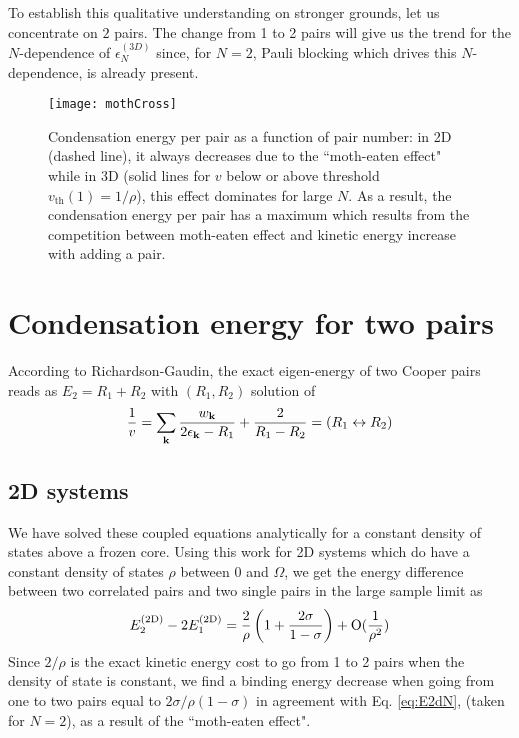 \documentclass[5p,twocolumn]{elsarticle}
\begin{document}
To establish this qualitative understanding on stronger  grounds, let us concentrate on  $2$ pairs. The change from 1 to 2 pairs will give us the trend for the $N$-dependence of $\epsilon^{(3D)}_N$ since, for $N=2$, Pauli blocking which drives this $N$-dependence, is already present.  

\begin{figure}[htb]
	\centering
		\texttt{[image: mothCross]}
	\caption{Condensation energy per pair as a function of pair number: in 2D (dashed line), it always decreases due to the ``moth-eaten effect" while in 3D (solid lines for  $v$ below or above threshold $v_{\text{th}}(1)=1/\rho$), this effect dominates for large $N$. As a result, the condensation energy per pair has a maximum which results from the competition between moth-eaten effect and kinetic energy increase with adding a pair.}
	\label{fig:3dCondChange}
\end{figure}

\section{Condensation energy for two pairs\label{sec:twoPair}}
According to Richardson-Gaudin, the exact eigen-energy of two Cooper pairs reads as $E_2=R_1+R_2$ with $(R_1,R_2)$ solution of
\begin{equation}
\frac{1}{v}=\sum_{\mathbf{k}}\frac{w_{\mathbf{k}}}{2\epsilon_{\mathbf{k}}-R_1}+\frac{2}{R_1-R_2}=(R_{1}\leftrightarrow{}R_{2})
\label{eq:richardsonEq}
\end{equation}

\subsection{2D systems}
We have solved these coupled equations analytically for a constant density of states above a frozen core\cite{combescotBCS}.  Using  this work  for 2D systems which do have a constant density of states $\rho$  between $0$ and $\Omega$, we get the energy difference between two correlated pairs and two single pairs in the large sample limit as 
\begin{equation}
E^{{{\text{(2D)}}}}_2-2E_1^{{{\text{(2D)}}}}=\frac{2}{\rho}\left(1+\frac{2\sigma}{1-\sigma}\right)+\text{O}(\frac{1}{\rho^2})
\end{equation}
 Since $2/\rho$  is the exact kinetic energy cost to go from 1 to 2 pairs when the density of state is constant, we find a binding energy decrease when going from one to two pairs equal to $2\sigma/\rho(1-\sigma)$ in agreement with Eq. \ref{eq:E2dN}, (taken for $N=2$), as a result of the ``moth-eaten effect". 
\end{document}
